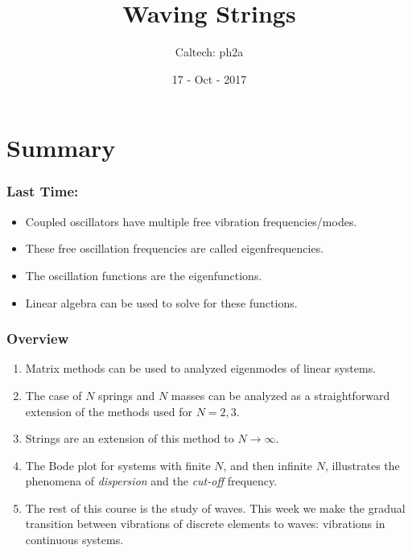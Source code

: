 \documentclass[pdf, hideothersubsections]{beamer}
\begin{document}
\title{Waving Strings}  
\author{Caltech: ph2a}
\date{17 - Oct - 2017}


\frame{\titlepage} 



\section{Summary}
\begin{frame}
\frametitle{Last Time:}
\begin{itemize}
\item Coupled oscillators have multiple free vibration frequencies/modes.
\item These free oscillation frequencies are called eigenfrequencies.
\item The oscillation functions are the eigenfunctions.
\item Linear algebra can be used to solve for these functions.
\end{itemize}
\end{frame}


\begin{frame}
\frametitle{Overview}
\begin{enumerate}
  \pause
\item Matrix methods can be used to analyzed eigenmodes of linear systems.
  \pause
\item The case of $N$ springs and $N$ masses can be analyzed as a
  straightforward extension of the methods used for $N = 2, 3$.
  \pause
\item Strings are an extension of this method to $N \rightarrow \infty$.
  \pause
\item The Bode plot for systems with finite $N$, and then 
  infinite $N$, illustrates the phenomena of \emph{dispersion} and the
  \emph{cut-off} frequency.
\pause
\item The rest of this course is the study of waves. This week we make
  the gradual transition between vibrations of discrete elements to
  waves: vibrations in continuous systems.
\end{enumerate}
\end{frame}
\end{document}
